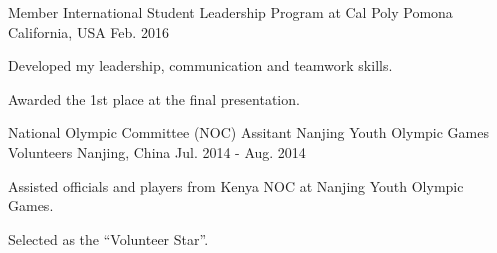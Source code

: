 

\begin{cventries}

  \cventry
    {Member} %
    {International Student Leadership Program at Cal Poly Pomona} %
    {California, USA} %
    {Feb. 2016} %
    {
      \begin{cvitems} %
        \item {Developed my leadership, communication and teamwork skills.}
        \item {Awarded the 1st place at the final presentation.}
      \end{cvitems}
    }

  \cventry
    {National Olympic Committee (NOC) Assitant} %
    {Nanjing Youth Olympic Games Volunteers} %
    {Nanjing, China} %
    {Jul. 2014 - Aug. 2014} %
    {
      \begin{cvitems} %
        \item {Assisted officials and players from Kenya NOC at Nanjing Youth Olympic Games.}
        \item {Selected as the ``Volunteer Star''.}
      \end{cvitems}
    }

    
\end{cventries}
